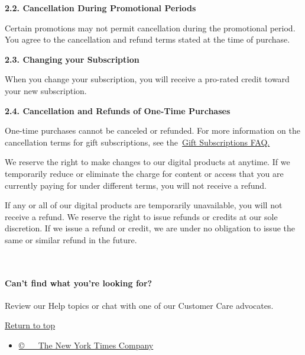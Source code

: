 \textbf{2.2. Cancellation During Promotional Periods}

Certain promotions may not permit cancellation during the promotional
period. You agree to the cancellation and refund terms stated at the
time of purchase.

\textbf{2.3. Changing your Subscription}

When you change your subscription, you will receive a pro-rated credit
toward your new subscription.

\textbf{2.4. Cancellation and Refunds of One-Time Purchases}

One-time purchases cannot be canceled or refunded. For more information
on the cancellation terms for gift subscriptions, see
the~\href{https://help.nytimes3xbfgragh.onion/hc/en-us/articles/115015919807-Gift-subscriptions}{Gift
Subscriptions FAQ.}

We reserve the right to make changes to our digital products at anytime.
If we temporarily reduce or eliminate the charge for content or access
that you are currently paying for under different terms, you will not
receive a refund.

If any or all of our digital products are temporarily unavailable, you
will not receive a refund. We reserve the right to issue refunds or
credits at our sole discretion. If we issue a refund or credit, we are
under no obligation to issue the same or similar refund in the future.

~

\hypertarget{cant-find-what-youre-looking-for}{%
\paragraph{Can't find what you're looking
for?}\label{cant-find-what-youre-looking-for}}

Review our Help topics or chat with one of our Customer Care advocates.

\protect\hyperlink{article-container}{Return to top}

\begin{itemize}
\tightlist
\item
  \href{http://www.nytimes3xbfgragh.onion/content/help/rights/copyright/copyright-notice.html}{©~
  ~ The New York Times Company }
\end{itemize}

